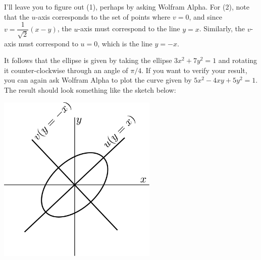 \documentclass[letterpaper,12pt]{article}
\begin{document}
\begin{enumerate}
\begin{enumerate}
I'll leave you to figure out (1), perhaps by asking Wolfram Alpha. For (2), note that the $u$-axis corresponds to the set of points where $v=0$, and since $v=\dfrac{1}{\sqrt{2}}(x-y)$, the $u$-axis must correspond to the line $y=x$. Similarly, the $v$-axis must correspond to $u=0$, which is the line $y=-x$.

It follows that the ellipse is given by taking the ellipse $3x^2+7y^2=1$ and rotating it counter-clockwise through an angle of $\pi/4$. If you want to verify your result, you can again ask Wolfram Alpha to plot the curve given by $5x^2-4xy+5y^2=1$. The result should look something like the sketch below:

\bigskip

\begin{center}
 \includegraphics[width=3in]{ellipse.pdf}
\end{center}



 \end{enumerate}
 \end{enumerate}
\end{document}

